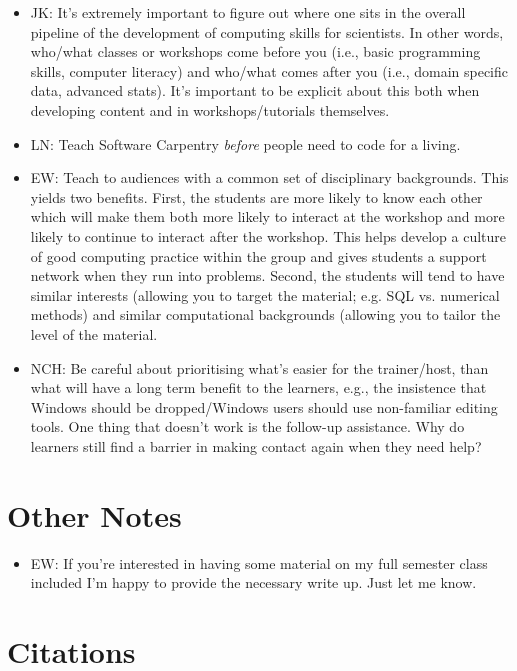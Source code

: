 \documentclass{article}
\begin{document}
\begin{itemize}
  \item JK: It's extremely important to figure out where one sits in the overall pipeline of the development of computing skills for scientists. In other words, who/what classes or workshops come before you (i.e., basic programming skills, computer literacy) and who/what comes after you (i.e., domain specific data, advanced stats). It's important to be explicit about this both when developing content and in workshops/tutorials themselves.

  \item LN: Teach Software Carpentry \emph{before} people need to code for a living.

  \item EW: Teach to audiences with a common set of disciplinary backgrounds. This yields two benefits. First, the students are more likely to know each other which will make them both more likely to interact at the workshop and more likely to continue to interact after the workshop. This helps develop a culture of good computing practice within the group and gives students a support network when they run into problems. Second, the students will tend to have similar interests (allowing you to target the material; e.g. SQL vs. numerical methods) and similar computational backgrounds (allowing you to tailor the level of the material.

  \item NCH: Be careful about prioritising what's easier for the trainer/host, than what will have a long term benefit to the learners, e.g., the insistence that Windows should be dropped/Windows users should use non-familiar editing tools.  One thing that doesn't work is the follow-up assistance. Why do learners still find a barrier in making contact again when they need help?

\end{itemize}

\section{Other Notes}

\begin{itemize}

  \item EW: If you're interested in having some material on my full semester class included I'm happy to provide the necessary write up. Just let me know.

\end{itemize}

\section{Citations}

\cite{hannay2009}
\cite{prabhu2011}
\cite{wilson1996}
\cite{wilson2006a}
\cite{wilson2006b}
\cite{wilson2009}



\end{document}
